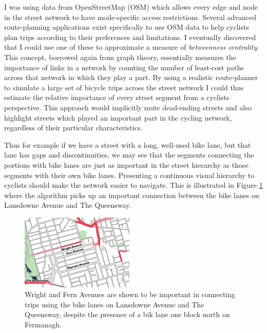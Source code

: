 \documentclass{article}
\begin{document}
		I was using data from OpenStreetMap (OSM) which allows every edge and node in the street network to have mode-specific access restrictions. Several advanced route-planning applications exist specifically to use OSM data to help cyclists plan trips according to their preferences and limitations. I eventually discovered that I could use one of these to approximate a measure of \textit{betweenness centrality}. This concept, borrowed again from graph theory, essentially measures the importance of links in a network by counting the number of least-cost paths across that network in which they play a part. 
		By using a realistic route-planner to simulate a large set of bicycle trips across the street network I could thus estimate the relative importance of every street segment from a cyclists perspective.
		This approach would implicitly mute dead-ending streets and also highlight streets which played an important part in the cycling network, regardless of their particular characteristics. 
		
		Thus for example if we have a street with a long, well-used bike lane, but that lane has gaps and discontinuities, we may see that the segments connecting the portions with bike lanes are just as important in the street hierarchy as those segments with their own bike lanes. Presenting a continuous visual hierarchy to cyclists should make the network easier to navigate. This is illustrated in Figure \ref{fig:spanned-gap} where the algorithm picks up an important connection between the bike lanes on Lansdowne Avenue and The Queensway. 
		\begin{figure}[h!]
			\includegraphics[width=0.48\textwidth]{spanned-gap}
			\caption{Wright and Fern Avenues are shown to be important in connecting trips using the bike lanes on Lansdowne Avenue and The Queensway, despite the presence of a bik lane one block north on Fermanagh.}
			\label{fig:spanned-gap}
		\end{figure}
	
\printbibliography
	
\end{document}
